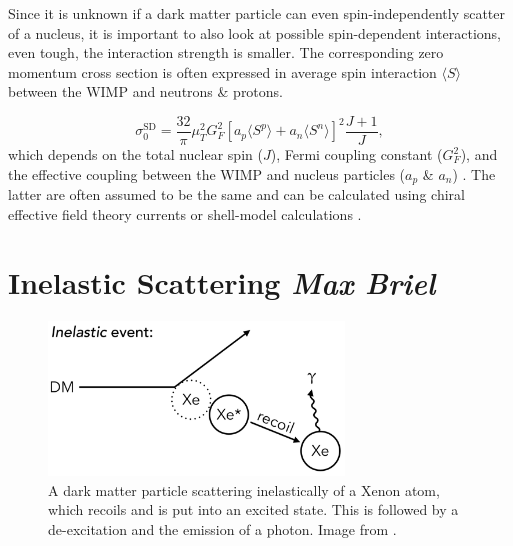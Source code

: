 \documentclass{article}
\begin{document}
Since it is unknown if a dark matter particle can even spin-independently scatter of a nucleus, it is important to also look at possible spin-dependent interactions, even tough, the interaction strength is smaller. The corresponding zero momentum cross section is often expressed in average spin interaction $\langle S \rangle$ between the WIMP and neutrons \& protons. 

\begin{equation}
    \sigma^\text{SD}_0 = \frac{32}{\pi} \mu^2_T G^2_F \left[a_p \langle S^p \rangle + a_n \langle S^n \rangle \right]^2 \frac{J+1}{J}, 
\end{equation}
which depends on the total nuclear spin ($J$), Fermi coupling constant ($G_F^2$), and the effective coupling between the WIMP and nucleus particles ($a_p$ \& $a_n$) \cite{Undagoitia:2015gya}. The latter are often assumed to be the same \cite{Kavanagh:2014rya} and can be  calculated using chiral effective field theory currents \cite{Klos:2013rwa} or shell-model calculations \cite{Toivanen:2009zza}. 


\FloatBarrier
\newpage

\section{Inelastic Scattering \small{\textit{Max Briel}}} 

\begin{figure}[h]
    \centering
    \includegraphics[width=0.7\textwidth]{Inelastic_Scattering.png}
    \caption{A dark matter particle scattering inelastically of a Xenon atom, which recoils and is put into an excited state. This is followed by a de-excitation and the emission of a photon. Image from \cite{McCabe:2015eia}.}
    \label{inelastic}
\end{figure}
\end{document}
